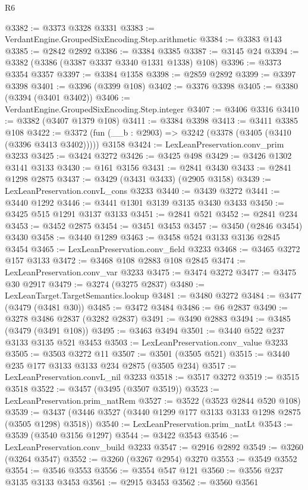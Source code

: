 \begin{lexlean}{R6}
\begin{coremodule}
@3382 := @3373 @3328 @3331
@3383 := VerdantEngine.GroupedSixEncoding.Step.arithmetic
@3384 := @3383 @143
@3385 := @2842 @2892
@3386 := @3384 @3385
@3387 := @3145 @24
@3394 := @3382 (@3386 (@3387 @3337 @3340 @1331 @1338) @108)
@3396 := @3373 @3354 @3357
@3397 := @3384 @1358
@3398 := @2859 @2892
@3399 := @3397 @3398
@3401 := @3396 (@3399 @108)
@3402 := @3376 @3398
@3405 := @3380 (@3394 (@3401 @3402))
@3406 := VerdantEngine.GroupedSixEncoding.Step.integer
@3407 := @3406 @3316
@3410 := @3382 (@3407 @1379 @108)
@3411 := @3384 @3398
@3413 := @3411 @3385 @108
@3422 := @3372 (fun (__b : @2903) => @3242 (@3378 (@3405 (@3410 (@3396 @3413 @3402))))) @3158
@3424 := LexLeanPreservation.conv_prim @3233
@3425 := @3424 @3272
@3426 := @3425 @498
@3429 := @3426 @1302 @3141 @3133
@3430 := @161 @3156
@3431 := @2841 @3430
@3433 := @2841 @1298 @2875
@3437 := @3429 (@3431 @3433) (@2905 @3158)
@3439 := LexLeanPreservation.convL_cons @3233
@3440 := @3439 @3272
@3441 := @3440 @1292
@3446 := @3441 @1301 @3139 @3135 @3430 @3433
@3450 := @3425 @515 @1291 @3137 @3133
@3451 := @2841 @521
@3452 := @2841 @234
@3453 := @3452 @2875
@3454 := @3451 @3453
@3457 := @3450 (@2846 @3454) @3430
@3458 := @3440 @1289
@3463 := @3458 @524 @3133 @3136 @2845 @3454
@3465 := LexLeanPreservation.conv_field @3233
@3468 := @3465 @3272 @157 @3133
@3472 := @3468 @108 @2883 @108 @2845
@3474 := LexLeanPreservation.conv_var @3233
@3475 := @3474 @3272
@3477 := @3475 @30 @2917
@3479 := @3274 (@3275 @2837)
@3480 := LexLeanTarget.TargetSemantics.lookup
@3481 := @3480 @3272
@3484 := @3477 (@3479 (@3481 @30))
@3485 := @3472 @3484
@3486 := @6 @2837
@3490 := @3278 @3486 @2837 (@3282 @2837)
@3491 := @3490 @2883
@3494 := @3485 (@3479 (@3491 @108))
@3495 := @3463 @3494
@3501 := @3440 @522 @237 @3133 @3135 @521 @3453
@3503 := LexLeanPreservation.conv_value @3233
@3505 := @3503 @3272 @11
@3507 := @3501 (@3505 @521)
@3515 := @3440 @235 @177 @3133 @3133 @234 @2875 (@3505 @234)
@3517 := LexLeanPreservation.convL_nil @3233
@3518 := @3517 @3272
@3519 := @3515 @3518
@3522 := @3457 (@3495 (@3507 @3519))
@3523 := LexLeanPreservation.prim_natRem
@3527 := @3522 (@3523 @2844 @520 @108)
@3539 := @3437 (@3446 @3527 (@3440 @1299 @177 @3133 @3133 @1298 @2875 (@3505 @1298) @3518))
@3540 := LexLeanPreservation.prim_natLt
@3543 := @3539 (@3540 @3156 @1297)
@3544 := @3422 @3543
@3546 := LexLeanPreservation.conv_build @3233
@3547 := @2916 @2892
@3549 := @3260 (@3264 @3547)
@3552 := @3260 (@3267 @2954) @3270
@3553 := @3549 @3552
@3554 := @3546 @3553
@3556 := @3554 @547 @121
@3560 := @3556 @237 @3135 @3133 @3453
@3561 := @2915 @3453
@3562 := @3560 @3561

\end{coremodule}
\end{lexlean}
